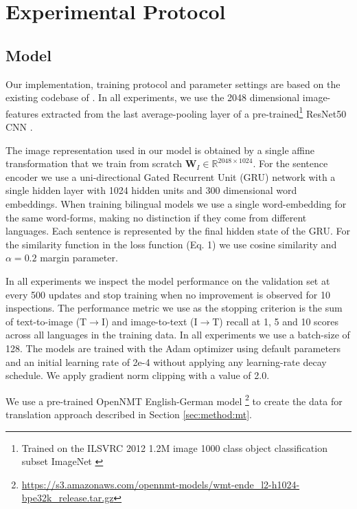 \section{Experimental Protocol}

\subsection{Model}

Our implementation, training protocol and parameter settings are based on the existing codebase of \cite{kadar2018conll}.
In all experiments, we use the 2048 dimensional image-features extracted from the
last average-pooling layer of a pre-trained\footnote{Trained on the ILSVRC 2012 1.2M image 1000 class object classification
subset ImageNet \citep{russakovsky2015imagenet}} 
ResNet50 CNN \citep{he2016deep}. 
  
The image representation used in our model is obtained by a single 
affine transformation that we train from scratch 
$\mathbf{W}_{I} \in \mathbb{R}^{2048 \times 1024}$. For the sentence
encoder we use a uni-directional Gated Recurrent Unit (GRU) 
network \citep{cho2014properties} with a single hidden layer with 
1024  hidden units and 300 dimensional word embeddings. 
When training bilingual models we use a single word-embedding
for the same word-forms, making no distinction if they come 
from different languages. Each sentence is represented by the final 
hidden state of the GRU. For the similarity function in the loss function (Eq. 1) we use cosine similarity and $\alpha=0.2$ margin parameter.

In all experiments we inspect the model performance on the validation 
set at every 500 updates
and stop training when no improvement is observed for 10 inspections. 
The performance metric we use as the stopping criterion is the 
sum of text-to-image (T$\rightarrow$I) and 
image-to-text (I$\rightarrow$T) recall at 1, 5 and 10 
scores across all languages in the training data. 
In all experiments we use a batch-size of 128.
The models are trained with the Adam optimizer \citep{kingma2014adam} 
using default parameters and an initial learning rate of
\mbox{2e-4}
without applying any learning-rate decay schedule.
We apply gradient norm clipping with a value of 2.0.

We use a pre-trained
OpenNMT \citep{2017opennmt} English-German model \footnote{\footnotesize{\url{https://s3.amazonaws.com/opennmt-models/wmt-ende_l2-h1024-bpe32k_release.tar.gz}}} to create the data for translation approach described in Section \ref{sec:method:mt}.


